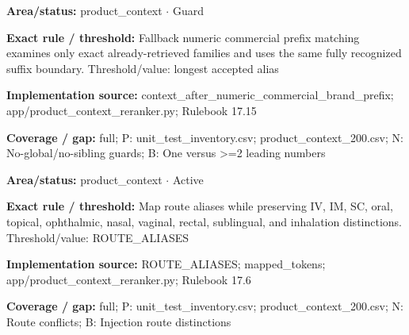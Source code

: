\begin{tcolorbox}[enhanced,breakable,colback=white,colframe=Muted!45,boxrule=0.45pt,arc=1.5pt,left=6pt,right=6pt,top=5pt,bottom=5pt,title={\texttt{PC-RETRIEVED-NUMERIC-PREFIX-23}},title after break={\texttt{PC-RETRIEVED-NUMERIC-PREFIX-23}\ (continued)},fonttitle=\headingfont\bfseries\color{Navy},coltitle=Navy]
\textbf{Area/status:} product\_\allowbreak{}context $\boldsymbol{\cdot}$ Guard\par
\smallskip
\textbf{Exact rule / threshold:} Fallback numeric commercial prefix matching examines only exact already-retrieved families and uses the same fully recognized suffix boundary. Threshold/\allowbreak{}value: longest accepted alias\par
\smallskip
\textbf{Implementation source:} context\_\allowbreak{}after\_\allowbreak{}numeric\_\allowbreak{}commercial\_\allowbreak{}brand\_\allowbreak{}prefix; app/\allowbreak{}product\_\allowbreak{}context\_\allowbreak{}reranker.py; Rulebook 17.15\par
\smallskip
\textbf{Coverage / gap:} full; P: unit\_\allowbreak{}test\_\allowbreak{}inventory.csv; product\_\allowbreak{}context\_\allowbreak{}200.csv; N: No-global/\allowbreak{}no-sibling guards; B: One versus >=2 leading numbers
\end{tcolorbox}
\begin{tcolorbox}[enhanced,breakable,colback=white,colframe=Muted!45,boxrule=0.45pt,arc=1.5pt,left=6pt,right=6pt,top=5pt,bottom=5pt,title={\texttt{PC-ROUTE-ALIASES-07}},title after break={\texttt{PC-ROUTE-ALIASES-07}\ (continued)},fonttitle=\headingfont\bfseries\color{Navy},coltitle=Navy]
\textbf{Area/status:} product\_\allowbreak{}context $\boldsymbol{\cdot}$ Active\par
\smallskip
\textbf{Exact rule / threshold:} Map route aliases while preserving IV, IM, SC, oral, topical, ophthalmic, nasal, vaginal, rectal, sublingual, and inhalation distinctions. Threshold/\allowbreak{}value: ROUTE\_\allowbreak{}ALIASES\par
\smallskip
\textbf{Implementation source:} ROUTE\_\allowbreak{}ALIASES; mapped\_\allowbreak{}tokens; app/\allowbreak{}product\_\allowbreak{}context\_\allowbreak{}reranker.py; Rulebook 17.6\par
\smallskip
\textbf{Coverage / gap:} full; P: unit\_\allowbreak{}test\_\allowbreak{}inventory.csv; product\_\allowbreak{}context\_\allowbreak{}200.csv; N: Route conflicts; B: Injection route distinctions
\end{tcolorbox}
